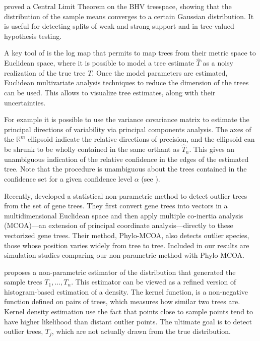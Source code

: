 \cite{barden2017logarithm} proved a Central Limit Theorem on the BHV treespace, showing that the distribution of the sample means converges to a certain Gaussian distribution. It is useful for detecting splits of weak and strong support and in tree-valued hypothesis testing.

A key tool of \cite{barden2014limiting}is  the log map  that permits to  map  trees  from  their  metric  space  to  Euclidean space, where it is possible to model a tree estimate $\hat T$ as a noisy realization of the true tree $T$. Once  the model parameters are estimated, Euclidean multivariate analysis techniques to reduce the dimension of the trees can be used. This allows to visualize tree estimates, along with their uncertainties.

For example it is possible to use the variance covariance matrix to  estimate  the  principal  directions  of  variability  via principal components analysis. The axes of the $\mathbb{R}^m$ ellipsoid indicate the relative directions of precision, and the ellipsoid can be shrunk  to be wholly contained in the same orthant as $\hat T_n$. This gives an unambiguous indication of the relative
confidence in the edges of the estimated tree. Note that the procedure is unambiguous about the trees contained in the confidence set for a given confidence level $\alpha$ (see \cite{willis2016confidence}).

Recently, \cite{de2012phylo} developed a statistical non-parametric method to detect outlier trees from the set of gene trees. They first convert gene trees into vectors in a multidimensional Euclidean space and then apply multiple co-inertia analysis (MCOA)—an extension of principal coordinate analysis—directly to these vectorized gene trees. Their method, Phylo-MCOA, also detects outlier species, those whose position varies widely from tree to tree. Included in our results are simulation studies comparing our non-parametric method with Phylo-MCOA.

\cite{weyenberg2014kdetrees}  proposes  a non-parametric estimator of the distribution that generated the sample trees $T_1,\ldots,T_n$.  This estimator can be viewed as a refined version of histogram-based estimation of a density. The kernel function, is a non-negative function defined on pairs of trees, which measures how similar two trees are. Kernel density estimation use the fact that points close to sample points tend to have higher likelihood than distant outlier points.  The ultimate goal is to detect outlier trees, $T_j$, which are not actually drawn from the true distribution.
%

